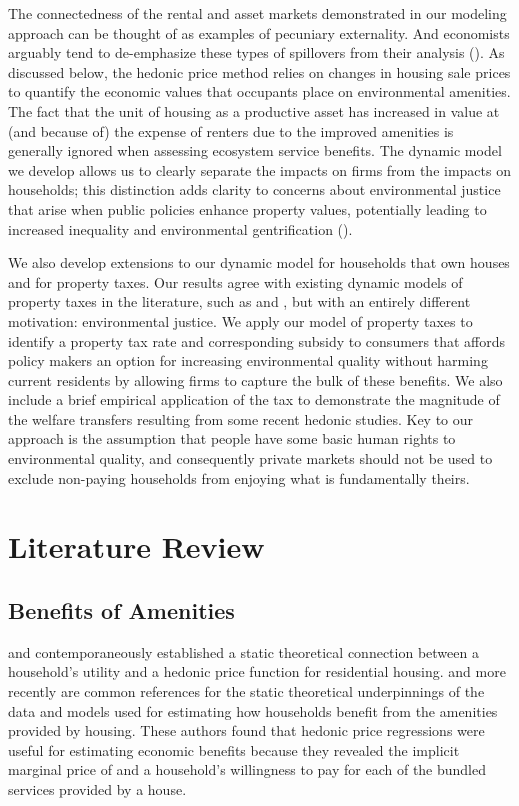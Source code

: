 \documentclass[ecta,nameyear,draft]{econsocart}
\theoremstyle{plain}
\theoremstyle{remark}
\begin{document}
The connectedness of the rental and asset markets demonstrated in our modeling approach can be thought of as examples of pecuniary externality. And economists arguably tend to de-emphasize these types of spillovers from their analysis (\cite{holcombe01}). As discussed below, the hedonic price method relies on changes in housing sale prices to quantify the economic values that occupants place on environmental amenities. The fact that the unit of housing as a productive asset has increased in value at (and because of) the expense of renters due to the improved amenities is generally ignored when assessing ecosystem service benefits. The dynamic model we develop allows us to clearly separate the impacts on firms from the impacts on households; this distinction adds clarity to concerns about environmental justice that arise when public policies enhance property values, potentially leading to increased inequality and environmental gentrification (\cite{banzhaf20}). 

We also develop extensions to our dynamic model for households that own houses and for property taxes. Our results agree with existing dynamic models of property taxes in the literature, such as \cite{freeman80} and \cite{poterba84}, but with an entirely different motivation: environmental justice. We apply our model of property taxes to identify a  property tax rate and corresponding subsidy to consumers that affords policy makers an option for increasing environmental quality without harming current residents by allowing firms to capture the bulk of these benefits. We also include a brief empirical application of the tax to demonstrate the magnitude of the welfare transfers resulting from some recent hedonic studies. Key to our approach is the assumption that people have some basic human rights to environmental quality, and consequently private markets should not be used to exclude non-paying households from enjoying what is fundamentally theirs.


\section{Literature Review}

\subsection{Benefits of Amenities}

\cite{rosen74} and \cite{freeman74} contemporaneously established a static theoretical connection between a household's utility and a hedonic price function for residential housing. \cite{freeman99} and more recently \cite{freeman14} are common references for the static theoretical underpinnings of the data and models used for estimating how households benefit from the amenities provided by housing. These authors found that hedonic price regressions were useful for estimating economic benefits because they revealed the implicit marginal price of and a household's willingness to pay for each of the bundled services provided by a house. 
\end{document}
